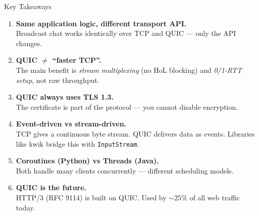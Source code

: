 \documentclass[aspectratio=169]{beamer}
\begin{document}
\begin{frame}{Key Takeaways}
  \begin{enumerate}
    \item<1-> \textbf{Same application logic, different transport API.}\\
      Broadcast chat works identically over TCP and QUIC --- only the API changes.

    \vspace{0.4em}
    \item<2-> \textbf{QUIC $\neq$ ``faster TCP''.}\\
      The main benefit is \emph{stream multiplexing} (no HoL blocking) and \emph{0/1-RTT setup}, not raw throughput.

    \vspace{0.4em}
    \item<3-> \textbf{QUIC always uses TLS 1.3.}\\
      The certificate is part of the protocol --- you cannot disable encryption.

    \vspace{0.4em}
    \item<4-> \textbf{Event-driven vs stream-driven.}\\
      TCP gives a continuous byte stream. QUIC delivers data as events. Libraries like kwik bridge this with \texttt{InputStream}.

    \vspace{0.4em}
    \item<5-> \textbf{Coroutines (Python) vs Threads (Java).}\\
      Both handle many clients concurrently --- different scheduling models.

    \vspace{0.4em}
    \item<6-> \textbf{QUIC is the future.}\\
      HTTP/3 (RFC 9114) is built on QUIC. Used by ${\sim}25\%$ of all web traffic today.
  \end{enumerate}
\end{frame}
\end{document}
